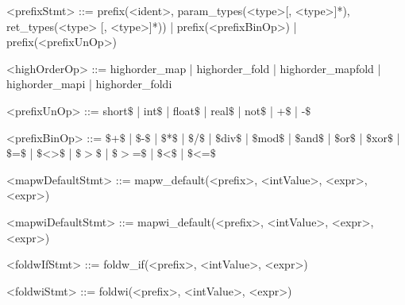 \documentclass{article}
\begin{document}
\begin{grammar}
<prefixStmt> ::= prefix(<ident>, param_types(<type>[, <type>]*), ret_types(<type> [, <type>]*)) |
                 prefix(<prefixBinOp>) | prefix(<prefixUnOp>)


<highOrderOp> ::= highorder_map | highorder_fold | highorder_mapfold |
                  highorder_mapi | highorder_foldi

<prefixUnOp> ::= short\(\$\) | int\(\$\) | float\(\$\) | real\(\$\) | not\(\$\) | +\(\$\) | -\(\$\)

<prefixBinOp> ::= \(\$\)+\(\$\) | \(\$\)-\(\$\) | \(\$\)*\(\$\) | \(\$\)/\(\$\) |
                  \(\$\)div\(\$\) | \(\$\)mod\(\$\) | \(\$\)and\(\$\) | \(\$\)or\(\$\) | \(\$\)xor\(\$\) |
                  \(\$\)=\(\$\) | \(\$\)<>\(\$\) | \(\$\)\(>\)\(\$\) | \(\$\)\(>\)=\(\$\) | \(\$\)\textless\(\$\) | \(\$\)\textless=\(\$\)

<mapwDefaultStmt> ::= mapw_default(<prefix>, <intValue>, <expr>, <expr>)

<mapwiDefaultStmt> ::= mapwi_default(<prefix>, <intValue>, <expr>, <expr>)

<foldwIfStmt> ::= foldw_if(<prefix>, <intValue>, <expr>)

<foldwiStmt> ::= foldwi(<prefix>, <intValue>, <expr>)

\end{grammar}
\end{document}
